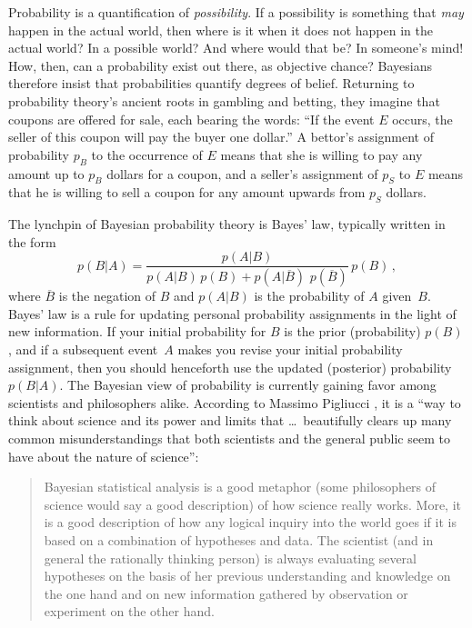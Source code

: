 \documentclass[12pt]{article}
\newcommand{\be}{\begin{equation}}
\newcommand{\ee}{\end{equation}}
\newcommand{\bq}{\begin{quote}}
\newcommand{\eq}{\end{quote}}
\begin{document}
Probability is a quantification of \emph{possibility}. If a possibility is something that \emph{may} happen in the actual world, then where is it when it does not happen in the actual world? In a possible world? And where would that be? In someone's mind! How, then, can a probability exist out there, as objective chance? Bayesians therefore insist that probabilities quantify degrees of belief. Returning to probability theory's ancient roots in {gambling} and {betting}, they imagine that coupons are offered for sale, each bearing the words: ``If the event $E$ occurs, the seller of this coupon will pay the buyer one dollar.'' A bettor's assignment of probability $p_B$ to the occurrence of $E$ means that she is willing to pay any amount up to $p_B$ dollars for a coupon, and a seller's assignment of $p_S$ to $E$ means that he is willing to sell a coupon for any amount upwards from $p_S$ dollars.

The lynchpin of Bayesian probability theory is {Bayes' law}, typically written in the form
\be
p(B|A) = \frac{p(A|B)}{p(A|B)\,p(B)+p(A|\overline{B})\,\,p(\overline{B})}
\,p(B)\,,
\label{Bayes}
\ee
where $\overline{B}$ is the negation of $B$ and $p(A|B)$ is the probability of $A$ given~$B$. Bayes' law is a rule for updating personal probability assignments in the light of new information. If your initial probability for $B$ is the prior (probability) $p(B)$, and if a subsequent event~$A$ makes you revise your initial probability assignment, then you should henceforth use the updated (posterior) probability $p(B|A)$. The Bayesian view of probability is currently gaining favor among scientists and philosophers alike. According to Massimo {Pigliucci} \cite{Pigliucci}, it is a ``way to think about science and its power and limits that \dots\ beautifully clears up many common misunderstandings that both scientists and the general public seem to have about the nature of science'':
\bq
Bayesian statistical analysis is a good metaphor (some philosophers of science would say a good description) of how science really works. More, it is a good description of how any logical inquiry into the world goes if it is based on a combination of hypotheses and data. The scientist (and in general the rationally thinking person) is always evaluating several hypotheses on the basis of her previous understanding and knowledge on the one hand and on new information gathered by observation or experiment on the other hand.
\eq
\end{document}
